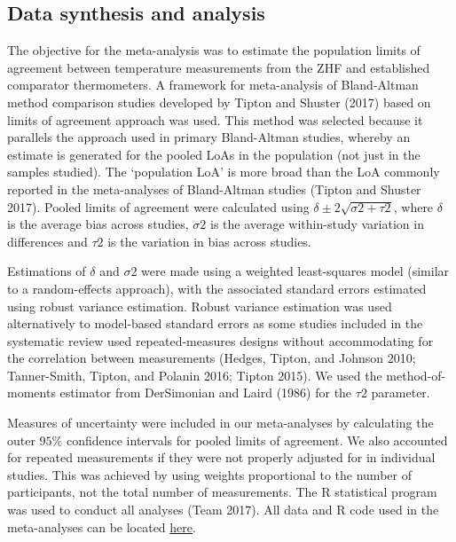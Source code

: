 \documentclass[smallextended]{svjour3}       %
\begin{document}
\hypertarget{data-synthesis-and-analysis}{%
\subsection{Data synthesis and
analysis}\label{data-synthesis-and-analysis}}

The objective for the meta-analysis was to estimate the population
limits of agreement between temperature measurements from the ZHF and
established comparator thermometers. A framework for meta-analysis of
Bland-Altman method comparison studies developed by Tipton and Shuster
(2017) based on limits of agreement approach was used. This method was
selected because it parallels the approach used in primary Bland-Altman
studies, whereby an estimate is generated for the pooled LoAs in the
population (not just in the samples studied). The `population LoA' is
more broad than the LoA commonly reported in the meta-analyses of
Bland-Altman studies (Tipton and Shuster 2017). Pooled limits of
agreement were calculated using \(\delta\pm2\sqrt{\sigma2+\tau2}\),
where \(\delta\) is the average bias across studies, \(\sigma2\) is the
average within-study variation in differences and \(\tau2\) is the
variation in bias across studies.

Estimations of \(\delta\) and \(\sigma2\) were made using a weighted
least-squares model (similar to a random-effects approach), with the
associated standard errors estimated using robust variance estimation.
Robust variance estimation was used alternatively to model-based
standard errors as some studies included in the systematic review used
repeated-measures designs without accommodating for the correlation
between measurements (Hedges, Tipton, and Johnson 2010; Tanner-Smith,
Tipton, and Polanin 2016; Tipton 2015). We used the method-of-moments
estimator from DerSimonian and Laird (1986) for the \(\tau2\) parameter.

Measures of uncertainty were included in our meta-analyses by
calculating the outer \(95\%\) confidence intervals for pooled limits of
agreement. We also accounted for repeated measurements if they were not
properly adjusted for in individual studies. This was achieved by using
weights proportional to the number of participants, not the total number
of measurements. The R statistical program was used to conduct all
analyses (Team 2017). All data and R code used in the meta-analyses can
be located \href{}{here}.
\end{document}
